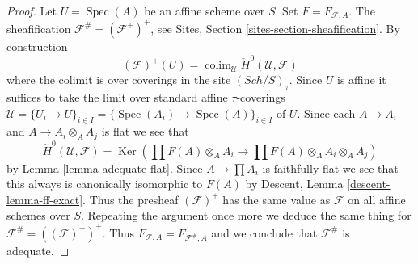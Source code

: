 \documentclass{stacks-project}
\theoremstyle{plain}
\theoremstyle{definition}
\theoremstyle{remark}
\numberwithin{equation}{subsection}
\def\colim{\mathop{\mathrm{colim}}\nolimits}
\def\Spec{\mathop{\mathrm{Spec}}}
\def\Sch{\mathit{Sch}}
\def\Ker{\mathop{\mathrm{Ker}}}
\begin{document}
\begin{proof}
Let $U = \Spec(A)$ be an affine scheme over $S$.
Set $F = F_{\mathcal{F}, A}$.
The sheafification $\mathcal{F}^\# = (\mathcal{F}^+)^+$, see
Sites, Section \ref{sites-section-sheafification}.
By construction
$$
(\mathcal{F})^+(U) =
\colim_\mathcal{U} \check{H}^0(\mathcal{U}, \mathcal{F})
$$
where the colimit is over coverings in the site $(\Sch/S)_\tau$.
Since $U$ is affine it suffices to take the limit over standard
affine $\tau$-coverings
$\mathcal{U} = \{U_i \to U\}_{i \in I} =
\{\Spec(A_i) \to \Spec(A)\}_{i \in I}$ of $U$.
Since each $A \to A_i$ and $A \to A_i \otimes_A A_j$ is flat we see that
$$
\check{H}^0(\mathcal{U}, \mathcal{F}) =
\Ker(\prod F(A) \otimes_A A_i \to \prod F(A) \otimes_A A_i \otimes_A A_j)
$$
by
Lemma \ref{lemma-adequate-flat}.
Since $A \to \prod A_i$ is faithfully flat we see that this always
is canonically isomorphic to $F(A)$ by
Descent, Lemma \ref{descent-lemma-ff-exact}.
Thus the presheaf $(\mathcal{F})^+$ has the same value as
$\mathcal{F}$ on all affine schemes over $S$. Repeating the argument
once more we deduce the same thing for $\mathcal{F}^\# = ((\mathcal{F})^+)^+$.
Thus $F_{\mathcal{F}, A} = F_{\mathcal{F}^\#, A}$ and we conclude
that $\mathcal{F}^\#$ is adequate.
\end{proof}
\end{document}
